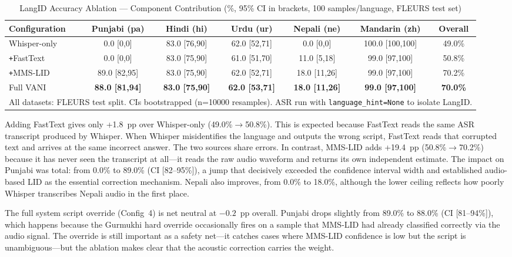 \documentclass[12pt, onecolumn]{IEEEtran}
\begin{document}
\begin{table}[htbp]
\caption{LangID Accuracy Ablation --- Component Contribution (\%, 95\% CI in brackets, 100 samples/language, FLEURS test set)}
\label{tab:ablation}
\begin{center}
\begin{tabular}{lcccccc}
\toprule
\textbf{Configuration} & \textbf{Punjabi (pa)} & \textbf{Hindi (hi)} & \textbf{Urdu (ur)} & \textbf{Nepali (ne)} & \textbf{Mandarin (zh)} & \textbf{Overall} \\
\midrule
Whisper-only         & 0.0 [0,0]      & 83.0 [76,90]   & 62.0 [52,71]   & 0.0 [0,0]      & 100.0 [100,100]   & 49.0\% \\
\texttt{+}FastText   & 0.0 [0,0]      & 83.0 [75,90]   & 61.0 [51,70]   & 11.0 [5,18]    & 99.0 [97,100]     & 50.8\% \\
\texttt{+}MMS-LID    & 89.0 [82,95]   & 83.0 [75,90]   & 62.0 [52,71]   & 18.0 [11,26]   & 99.0 [97,100]     & 70.2\% \\
Full VANI            & \textbf{88.0 [81,94]} & \textbf{83.0 [75,90]} & \textbf{62.0 [53,71]} & \textbf{18.0 [11,26]} & \textbf{99.0 [97,100]} & \textbf{70.0\%} \\
\midrule
\multicolumn{7}{l}{\footnotesize All datasets: FLEURS test split. CIs bootstrapped (n=10000 resamples). ASR run with \texttt{language\_hint=None} to isolate LangID.} \\
\bottomrule
\end{tabular}
\end{center}
\end{table}

Adding FastText gives only +1.8~pp over Whisper-only (49.0\%$\rightarrow$50.8\%). This is expected because FastText reads the same ASR transcript produced by Whisper. When Whisper misidentifies the language and outputs the wrong script, FastText reads that corrupted text and arrives at the same incorrect answer. The two sources share errors. In contrast, MMS-LID adds +19.4~pp (50.8\%$\rightarrow$70.2\%) because it has never seen the transcript at all---it reads the raw audio waveform and returns its own independent estimate. The impact on Punjabi was total: from 0.0\% to 89.0\% (CI [82--95\%]), a jump that decisively exceeded the confidence interval width and established audio-based LID as the essential correction mechanism. Nepali also improves, from 0.0\% to 18.0\%, although the lower ceiling reflects how poorly Whisper transcribes Nepali audio in the first place.

The full system script override (Config~4) is net neutral at $-0.2$~pp overall. Punjabi drops slightly from 89.0\% to 88.0\% (CI [81--94\%]), which happens because the Gurmukhi hard override occasionally fires on a sample that MMS-LID had already classified correctly via the audio signal. The override is still important as a safety net---it catches cases where MMS-LID confidence is low but the script is unambiguous---but the ablation makes clear that the acoustic correction carries the weight.
\end{document}

